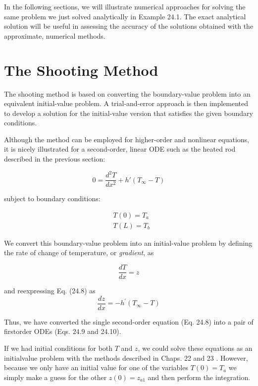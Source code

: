 \documentclass[../main.tex]{subfiles}
\begin{document}
In the following sections, we will illustrate numerical approaches for solving the same
problem we just solved analytically in Example 24.1. The exact analytical solution will be
useful in assessing the accuracy of the solutions obtained with the approximate, numerical
methods. \vspace{2cm}


\section{The Shooting Method}

\noindent The shooting method is based on converting the boundary-value problem into an equivalent initial-value problem. A trial-and-error approach is then implemented to develop a solution for the initial-value version that satisfies the given boundary conditions.

Although the method can be employed for higher-order and nonlinear equations, it is
nicely illustrated for a second-order, linear ODE such as the heated rod described in the
previous section:

\begin{equation}
    \tag{24.8}
    0=\frac{d^2T}{dx^2}+h'(T_\infty-T)
\end{equation}

\noindent subject to boundary conditions:

\begin{equation} \nonumber
    \begin{aligned}
        &T(0)=T_a\\
        &T(L)=T_b
    \end{aligned}
\end{equation}

We convert this boundary-value problem into an initial-value problem by defining the
rate of change of temperature, or \textit{gradient}, as

\begin{equation}
    \tag{24.9}
    \frac{d T}{d x}=z
\end{equation}

and reexpressing Eq. (24.8) as
\begin{equation}
    \tag{24.10}
    \frac{d z}{d x}=-h^{\prime}\left(T_{\infty}-T\right)
\end{equation}

\noindent Thus, we have converted the single second-order equation (Eq. 24.8) into a pair of firstorder ODEs (Eqs. $24.9$ and 24.10).

If we had initial conditions for both $T$ and $z$, we could solve these equations as an initialvalue problem with the methods described in Chaps. 22 and 23 . However, because we only have an initial value for one of the variables $T(0)=T_{a}$ we simply make a guess for the other $z(0)=z_{a 1}$ and then perform the integration.
\end{document}
